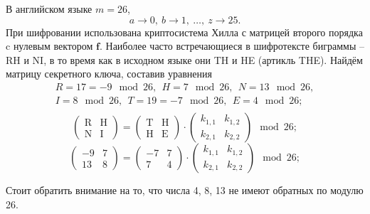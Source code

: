 \example В английском языке $m = 26$,
    \[ a \rightarrow 0, ~ b \rightarrow 1, ~ \dots, ~ z \rightarrow 25. \]
При шифровании использована криптосистема Хилла с матрицей второго порядка c нулевым вектором $\mathbf{f}$. Наиболее часто встречающиеся в шифротексте биграммы -- RH и NI, в то время как в исходном языке они TH и HE (артикль THE). Найдём матрицу секретного ключа, составив уравнения
\[
    \begin{array}{l}
        R = 17 = -9 \mod 26, ~~ H = 7 \mod 26, ~~ N = 13 \mod 26, \\
        I = 8 \mod 26, ~~ T = 19 = -7 \mod 26, ~~ E=4 \mod 26; \\
    \end{array}
\] \[
    \left( \begin{array}{cc}
        \text{R} & \text{H} \\
        \text{N} & \text{I}
    \end{array} \right) =
    \left( \begin{array}{cc}
        \text{T} & \text{H} \\
        \text{H} & \text{E}
    \end{array} \right) \cdot
    \left( \begin{array}{cc}
        k_{1,1} & k_{1,2} \\
        k_{2,1} & k_{2,2}
    \end{array} \right) \mod 26;
\] \[
    \left( \begin{array}{cc}
        -9 & 7 \\
        13 & 8
    \end{array} \right) =
    \left( \begin{array}{cc}
        -7 & 7 \\
        7 & 4
    \end{array} \right) \cdot
    \left( \begin{array}{cc}
        k_{1,1} & k_{1,2} \\
        k_{2,1} & k_{2,2}
    \end{array} \right) \mod 26;
\]

Стоит обратить внимание на то, что числа 4, 8, 13 не имеют обратных по модулю 26.

